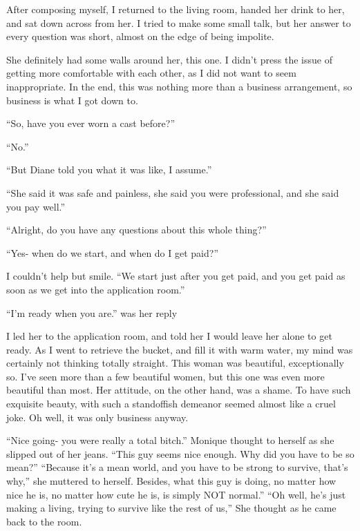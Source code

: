     After composing myself, I returned to the living room, handed her drink to her, and sat down
across from her. I tried to make some small talk, but her answer to every question was short,
almost on the edge of being impolite.

    She definitely had some walls around her, this one. I didn't press the issue of getting more
comfortable with each other, as I did not want to seem inappropriate. In the end, this was
nothing more than a business arrangement, so business is what I got down to.

    ``So, have you ever worn a cast before?''

    ``No.''

    ``But Diane told you what it was like, I assume.''

    ``She said it was safe and painless, she said you were professional, and she said you pay
well.''

    ``Alright, do you have any questions about this whole thing?''

    ``Yes- when do we start, and when do I get paid?''

    I couldn't help but smile. ``We start just after you get paid, and you get paid as soon as
we get into the application room.''

    ``I'm ready when you are.'' was her reply

    I led her to the application room, and told her I would leave her alone to get ready. As I
went to retrieve the bucket, and fill it with warm water, my mind was certainly not thinking
totally straight. This woman was beautiful, exceptionally so. I've seen more than a few
beautiful women, but this one was even more beautiful than most. Her attitude, on the other
hand, was a shame. To have such exquisite beauty, with such a standoffish demeanor seemed almost
like a cruel joke. Oh well, it was only business anyway.

\begin{thought}
    ``Nice going- you were really a total bitch.'' Monique thought to herself as she slipped out
of her jeans. ``This guy seems nice enough. Why did you have to be so mean?'' ``Because it's a
mean world, and you have to be strong to survive, that's why,'' she muttered to herself.
Besides, what this guy is doing, no matter how nice he is, no matter how cute he is, is simply
NOT normal.'' ``Oh well, he's just making a living, trying to survive like the rest of us,'' She
thought as he came back to the room.
\end{thought}

